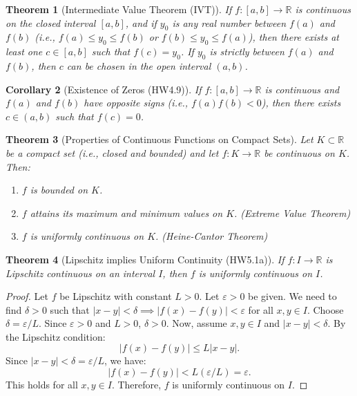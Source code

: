 \documentclass{article}
\theoremstyle{definition}
\theoremstyle{plain}
\newtheorem{theorem}{Theorem}[section]
\newtheorem{corollary}[theorem]{Corollary}
\theoremstyle{remark}
\newcommand{\R}{\mathbb{R}}
\newcommand{\eps}{\varepsilon}
\begin{document}
\begin{theorem}[Intermediate Value Theorem (IVT){\cite[Thm 18.2]{Ross}}]
If \(f: [a, b] \to \R\) is continuous on the closed interval \([a, b]\), and if \(y_0\) is any real number between \(f(a)\) and \(f(b)\) (i.e., \(f(a) \le y_0 \le f(b)\) or \(f(b) \le y_0 \le f(a)\)), then there exists at least one \(c \in [a, b]\) such that \(f(c) = y_0\). If \(y_0\) is strictly between \(f(a)\) and \(f(b)\), then \(c\) can be chosen in the open interval \((a, b)\).
\end{theorem}

\begin{corollary}[Existence of Zeros (HW4.9)]
If \(f: [a, b] \to \R\) is continuous and \(f(a)\) and \(f(b)\) have opposite signs (i.e., \(f(a)f(b) < 0\)), then there exists \(c \in (a, b)\) such that \(f(c) = 0\).
\end{corollary}

\begin{theorem}[Properties of Continuous Functions on Compact Sets{\cite[Thm 18.1, 19.2]{Ross}}] \label{thm:compact_cont}
Let \(K \subset \R\) be a compact set (i.e., closed and bounded) and let \(f: K \to \R\) be continuous on \(K\). Then:
\begin{enumerate}
    \item \(f\) is bounded on \(K\).
    \item \(f\) attains its maximum and minimum values on \(K\). (Extreme Value Theorem)
    \item \(f\) is uniformly continuous on \(K\). (Heine-Cantor Theorem)
\end{enumerate}
\end{theorem}

\begin{theorem}[Lipschitz implies Uniform Continuity (HW5.1a)]
If \(f: I \to \R\) is Lipschitz continuous on an interval \(I\), then \(f\) is uniformly continuous on \(I\).
\end{theorem}
\begin{proof}
Let \(f\) be Lipschitz with constant \(L>0\). Let \(\eps > 0\) be given.
We need to find \(\delta > 0\) such that \( |x - y| < \delta \implies |f(x) - f(y)| < \eps \) for all \(x, y \in I\).
Choose \(\delta = \eps / L\). Since \(\eps > 0\) and \(L > 0\), \(\delta > 0\).
Now, assume \(x, y \in I\) and \(|x - y| < \delta\). By the Lipschitz condition:
\[ |f(x) - f(y)| \le L |x - y|. \]
Since \(|x - y| < \delta = \eps / L\), we have:
\[ |f(x) - f(y)| < L (\eps / L) = \eps. \]
This holds for all \(x, y \in I\). Therefore, \(f\) is uniformly continuous on \(I\).
\end{proof}
\end{document}
